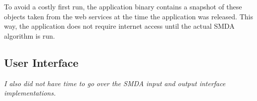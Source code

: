 To avoid a costly first run, the application binary contains a snapshot of these
objects taken from the web services at the time the application was released.
This way, the application does not require internet access until the actual SMDA
algorithm is run.

\subsection{User Interface}
\label{sect:smda_results_ui}

\emph{I also did not have time to go over the SMDA input and output interface
implementations.}
